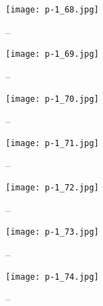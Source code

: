 \clearpage


\begin{figure}
    \begin{center}
        \texttt{[image: p-1\_68.jpg]}
        \caption{--}
    \end{center}
\end{figure}

\clearpage


\begin{figure}
    \begin{center}
        \texttt{[image: p-1\_69.jpg]}
        \caption{--}
    \end{center}
\end{figure}

\clearpage


\begin{figure}
    \begin{center}
        \texttt{[image: p-1\_70.jpg]}
        \caption{--}
    \end{center}
\end{figure}

\clearpage


\begin{figure}
    \begin{center}
        \texttt{[image: p-1\_71.jpg]}
        \caption{--}
    \end{center}
\end{figure}

\clearpage


\begin{figure}
    \begin{center}
        \texttt{[image: p-1\_72.jpg]}
        \caption{--}
    \end{center}
\end{figure}

\clearpage


\begin{figure}
    \begin{center}
        \texttt{[image: p-1\_73.jpg]}
        \caption{--}
    \end{center}
\end{figure}

\clearpage


\begin{figure}
    \begin{center}
        \texttt{[image: p-1\_74.jpg]}
        \caption{--}
    \end{center}
\end{figure}

